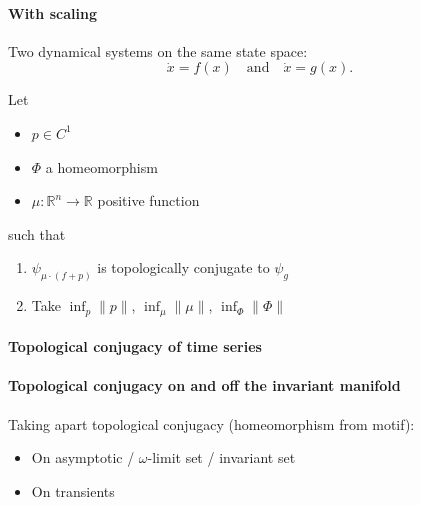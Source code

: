 \documentclass{article}
\theoremstyle{definition} \newtheorem{definition}{Definition}  \newtheorem{example}{Example}
\theoremstyle{remark} \newtheorem{remark}{Remark}
\newcounter{ct}
\newcommand{\field}[1]{\ensuremath{\mathbb{#1}}}
\newcommand{\reals}{\field{R}}
\begin{document}
\paragraph{With scaling}
Two dynamical systems on the same state space:
\[
\dot{x} = f(x) \quad \text{and} \quad \dot{x} = g(x).
\]

Let 
\begin{itemize}
\item $p\in C^1$
\item $\Phi$ a homeomorphism
\item $\mu\colon \reals^n\rightarrow \reals$ positive function
\end{itemize}
such that 
\begin{enumerate}
\item $\psi_{\mu \cdot (f+p)}$ is topologically conjugate to $\psi_{g}$
\item Take $\inf_p \|p\|$, $\inf_\mu \|\mu\|$, $\inf_\Phi \|\Phi\|$
\end{enumerate}


\paragraph{Topological conjugacy of time series}
\citep{dlotko2024topconj}


\paragraph{Topological conjugacy on and off the invariant manifold}
Taking apart topological conjugacy (homeomorphism from motif):
\begin{itemize}
\item On asymptotic / $\omega$-limit set / invariant set
\item On transients \citep{koch2024biological}
\end{itemize}
\end{document}
